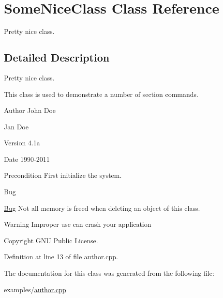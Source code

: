\hypertarget{class_some_nice_class}{}\section{Some\+Nice\+Class Class Reference}
\label{class_some_nice_class}


Pretty nice class.  




\subsection{Detailed Description}
Pretty nice class. 

This class is used to demonstrate a number of section commands. \begin{DoxyAuthor}{Author}
John Doe 

Jan Doe 
\end{DoxyAuthor}
\begin{DoxyVersion}{Version}
4.\+1a 
\end{DoxyVersion}
\begin{DoxyDate}{Date}
1990-\/2011 
\end{DoxyDate}
\begin{DoxyPrecond}{Precondition}
First initialize the system. 
\end{DoxyPrecond}
\begin{DoxyRefDesc}{Bug}
\item[\mbox{\hyperlink{bug__bug000001}{Bug}}]Not all memory is freed when deleting an object of this class. \end{DoxyRefDesc}
\begin{DoxyWarning}{Warning}
Improper use can crash your application 
\end{DoxyWarning}
\begin{DoxyCopyright}{Copyright}
G\+NU Public License. 
\end{DoxyCopyright}


Definition at line 13 of file author.\+cpp.



The documentation for this class was generated from the following file\+:\begin{DoxyCompactItemize}
\item 
examples/\mbox{\hyperlink{author_8cpp}{author.\+cpp}}\end{DoxyCompactItemize}
